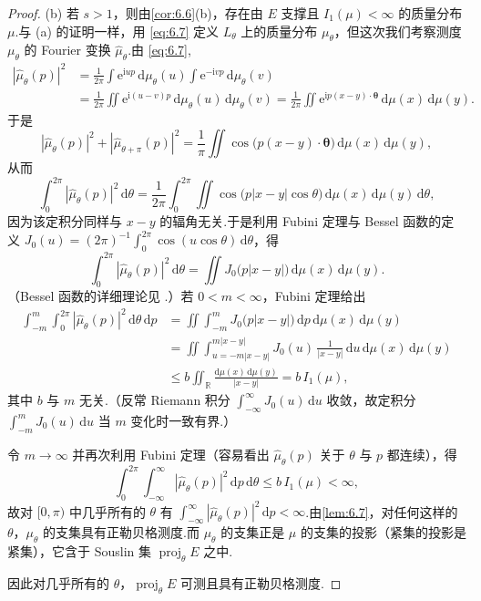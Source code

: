 \begin{proof}
(b) 若 $s>1$，则由\cref{cor:6.6}(b)，存在由 $E$ 支撑且 $I_1(\mu)<\infty$ 的质量分布 $\mu$.与 (a) 的证明一样，用 \eqref{eq:6.7} 定义 $L_\theta$ 上的质量分布 $\mu_\theta$，但这次我们考察测度 $\mu_\theta$ 的 Fourier 变换 $\hat{\mu}_\theta$.由 \eqref{eq:6.7},
\begin{align*}
  |\hat{\mu}_\theta(p)|^{2}
  &=\frac{1}{2\pi}\int\mathrm{e}^{\mathrm{i}up}\,\mathrm{d}\mu_\theta(u)\int\mathrm{e}^{-\mathrm{i}vp}\,\mathrm{d}\mu_\theta(v)\\
  &=\frac{1}{2\pi}\iint\mathrm{e}^{\mathrm{i}(u-v)p}\,\mathrm{d}\mu_\theta(u)\,\mathrm{d}\mu_\theta(v)
  =\frac{1}{2\pi}\iint\mathrm{e}^{\mathrm{i}p(x-y)\cdot\boldsymbol{\theta}}\,\mathrm{d}\mu(x)\,\mathrm{d}\mu(y).
\end{align*}
于是
\[
  |\hat{\mu}_\theta(p)|^{2}+|\hat{\mu}_{\theta+\pi}(p)|^{2}
  =\frac{1}{\pi}\iint\cos\bigl(p(x-y)\cdot\boldsymbol{\theta}\bigr)\,\mathrm{d}\mu(x)\,\mathrm{d}\mu(y),
\]
从而
\[
  \int_{0}^{2\pi}|\hat{\mu}_\theta(p)|^{2}\,\mathrm{d}\theta
  =\frac{1}{2\pi}\int_{0}^{2\pi}\iint\cos\bigl(p|x-y|\cos\theta\bigr)\,\mathrm{d}\mu(x)\,\mathrm{d}\mu(y)\,\mathrm{d}\theta,
\]
因为该定积分同样与 $x-y$ 的辐角无关.于是利用 Fubini 定理与 Bessel 函数的定义 $J_0(u)=(2\pi)^{-1}\int_{0}^{2\pi}\cos(u\cos\theta)\,\mathrm{d}\theta$，得
\[
  \int_{0}^{2\pi}|\hat{\mu}_\theta(p)|^{2}\,\mathrm{d}\theta
  =\iint J_0\bigl(p|x-y|\bigr)\,\mathrm{d}\mu(x)\,\mathrm{d}\mu(y).
\]
（Bessel 函数的详细理论见 \textcite{watson1966}.）若 $0<m<\infty$，Fubini 定理给出
\[
\begin{aligned}
  \int_{-m}^{m}\int_{0}^{2\pi}|\hat{\mu}_\theta(p)|^{2}\,\mathrm{d}\theta\,\mathrm{d}p
  &=\iint\int_{-m}^{m}J_0\bigl(p|x-y|\bigr)\,\mathrm{d}p\,\mathrm{d}\mu(x)\,\mathrm{d}\mu(y)\\
  &=\iint\int_{u=-m|x-y|}^{m|x-y|}J_0(u)\,\frac{1}{|x-y|}\,\mathrm{d}u\,\mathrm{d}\mu(x)\,\mathrm{d}\mu(y)\\
  &\leq b\iint_{\mathbb{R}}\frac{\mathrm{d}\mu(x)\,\mathrm{d}\mu(y)}{|x-y|}
  =b\,I_1(\mu),
\end{aligned}
\]
其中 $b$ 与 $m$ 无关.（反常 Riemann 积分 $\int_{-\infty}^{\infty}J_0(u)\,\mathrm{d}u$ 收敛，故定积分 $\int_{-m}^{m}J_0(u)\,\mathrm{d}u$ 当 $m$ 变化时一致有界.）

令 $m\to\infty$ 并再次利用 Fubini 定理（容易看出 $\hat{\mu}_\theta(p)$ 关于 $\theta$ 与 $p$ 都连续），得
\[
  \int_{0}^{2\pi}\int_{-\infty}^{\infty}|\hat{\mu}_\theta(p)|^{2}\,\mathrm{d}p\,\mathrm{d}\theta\leq b\,I_1(\mu)<\infty,
\]
故对 $[0,\pi)$ 中几乎所有的 $\theta$ 有 $\int_{-\infty}^{\infty}|\hat{\mu}_\theta(p)|^{2}\,\mathrm{d}p<\infty$.由\cref{lem:6.7}，对任何这样的 $\theta$，$\mu_\theta$ 的支集具有正勒贝格测度.而 $\mu_\theta$ 的支集正是 $\mu$ 的支集的投影（紧集的投影是紧集），它含于 Souslin 集 $\operatorname{proj}_{\theta}E$ 之中.

因此对几乎所有的 $\theta$，$\operatorname{proj}_{\theta}E$ 可测且具有正勒贝格测度.
\end{proof}

